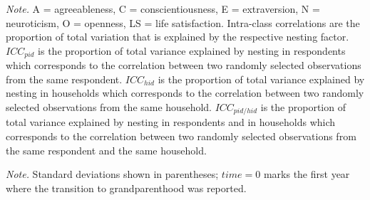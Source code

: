\documentclass[
  english,
  man, noextraspace,floatsintext]{apa7}
\newenvironment{lltable}{\begin{landscape}\begin{center}\begin{ThreePartTable}}{\end{ThreePartTable}\end{center}\end{landscape}}
\begin{document}
\begin{appendix}
\begin{table}[h]
\begin{center}
\begin{threeparttable}
\begin{tablenotes}[para]
\normalsize{\textit{Note.} A = agreeableness, C = conscientiousness, E = extraversion, N = neuroticism, O = openness, LS = life satisfaction. Intra-class correlations are the proportion of total variation that is explained by the respective nesting factor. $ICC_{pid}$ is the proportion of total variance explained by nesting in respondents which corresponds to the correlation between two randomly selected observations from the same respondent. $ICC_{hid}$ is the proportion of total variance explained by nesting in households which corresponds to the correlation between two randomly selected observations from the same household. $ICC_{pid/hid}$ is the proportion of total variance explained by nesting in respondents and in households which corresponds to the correlation between two randomly selected observations from the same respondent and the same household.}
\end{tablenotes}

\end{threeparttable}
\end{center}

\end{table}








\begin{lltable}

\begin{TableNotes}[para]
\normalsize{\textit{Note.} Standard deviations shown in parentheses;
\(time=0\) marks the first year where the transition to grandparenthood
was reported.}
\end{TableNotes}

\small{

}
\end{lltable}
\end{appendix}
\end{document}
